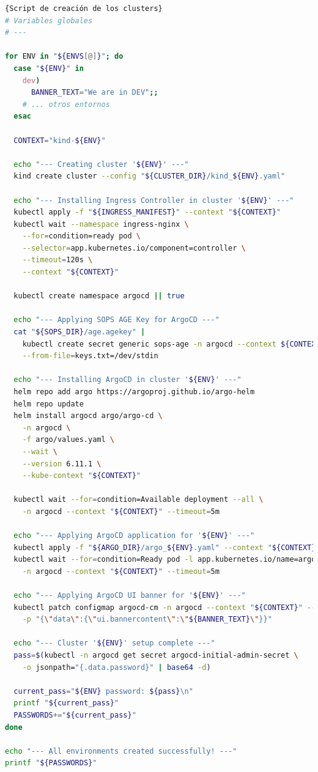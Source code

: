 \begin{lstlisting}[language=bash,label=lst:create-clusters]{Script de creación de los clusters}
# Variables globales
# ---

for ENV in "${ENVS[@]}"; do
  case "${ENV}" in
    dev)
      BANNER_TEXT="We are in DEV";;
    # ... otros entornos
  esac

  CONTEXT="kind-${ENV}"

  echo "--- Creating cluster '${ENV}' ---"
  kind create cluster --config "${CLUSTER_DIR}/kind_${ENV}.yaml"

  echo "--- Installing Ingress Controller in cluster '${ENV}' ---"
  kubectl apply -f "${INGRESS_MANIFEST}" --context "${CONTEXT}"
  kubectl wait --namespace ingress-nginx \
    --for=condition=ready pod \
    --selector=app.kubernetes.io/component=controller \
    --timeout=120s \
    --context "${CONTEXT}"

  kubectl create namespace argocd || true

  echo "--- Applying SOPS AGE Key for ArgoCD ---"
  cat "${SOPS_DIR}/age.agekey" |
    kubectl create secret generic sops-age -n argocd --context ${CONTEXT} \
    --from-file=keys.txt=/dev/stdin

  echo "--- Installing ArgoCD in cluster '${ENV}' ---"
  helm repo add argo https://argoproj.github.io/argo-helm
  helm repo update
  helm install argocd argo/argo-cd \
    -n argocd \
    -f argo/values.yaml \
    --wait \
    --version 6.11.1 \
    --kube-context "${CONTEXT}"

  kubectl wait --for=condition=Available deployment --all \
    -n argocd --context "${CONTEXT}" --timeout=5m

  echo "--- Applying ArgoCD application for '${ENV}' ---"
  kubectl apply -f "${ARGO_DIR}/argo_${ENV}.yaml" --context "${CONTEXT}"
  kubectl wait --for=condition=Ready pod -l app.kubernetes.io/name=argocd-server \
    -n argocd --context "${CONTEXT}" --timeout=5m

  echo "--- Applying ArgoCD UI banner for '${ENV}' ---"
  kubectl patch configmap argocd-cm -n argocd --context "${CONTEXT}" --type merge \
    -p "{\"data\":{\"ui.bannercontent\":\"${BANNER_TEXT}\"}}"

  echo "--- Cluster '${ENV}' setup complete ---"
  pass=$(kubectl -n argocd get secret argocd-initial-admin-secret \
    -o jsonpath="{.data.password}" | base64 -d)

  current_pass="${ENV} password: ${pass}\n"
  printf "${current_pass}"
  PASSWORDS+="${current_pass}"
done

echo "--- All environments created successfully! ---"
printf "${PASSWORDS}"
\end{lstlisting}

